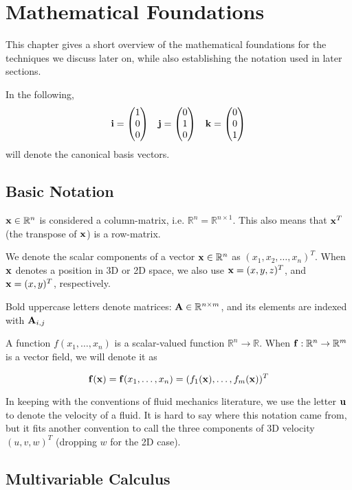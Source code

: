 \chapter{Mathematical Foundations}
\label{sec:mathematicalFoundations}
This chapter gives a short overview of the mathematical foundations for the
techniques we discuss later on, while also establishing the notation used in
later sections.

In the following,
\begin{equation*}
    \vb{i} = \mqty( 1 \\ 0 \\ 0 )\quad
    \vb{j} = \mqty( 0 \\ 1 \\ 0 )\quad
    \vb{k} = \mqty( 0 \\ 0 \\ 1 )
\end{equation*}
will denote the canonical basis vectors.

\section{Basic Notation}

$\vb{x} \in \mathbb{R}^n$ is considered a column-matrix, i.e. $\mathbb{R}^n
= \mathbb{R}^{n \times 1}$. This also means that $\vb{x}^T$ (the transpose of
$\vb{x}$) is a row-matrix.

We denote the scalar components of a vector $\vb{x}\in \mathbb{R}^{n}$ as $(x_1,
x_2, \dots, x_n)^T$. When $\vb{x}$ denotes a position in 3D or 2D space, we also
use $\vb{x} = (x,y,z)^T$, and $\vb{x} = (x,y)^T$, respectively.

Bold uppercase letters denote matrices: $\vb{A}\in \mathbb{R}^{n \times m}$, and
its elements are indexed with $\vb{A}_{i,j}$

A function $f(x_1, \dots, x_n)$ is a scalar-valued function $\mathbb{R}^n \to
\mathbb{R}$.  When $\vb{f}: \mathbb{R}^n \to \mathbb{R}^m$ is a vector field, we
will denote it as 

$$\vb{f}(\vb{x}) = \vb{f}(x_1,\dots, x_n) =
(f_1(\vb{x}), \dots, f_m(\vb{x}))^T$$

In keeping with the conventions of fluid mechanics literature, we use the letter
$\vb{u}$ to denote the velocity of a fluid. It is hard to say where this
notation came from, but it fits another convention to call the three components
of 3D velocity $(u, v, w)^T$ (dropping $w$ for the 2D case).

\section{Multivariable Calculus}

